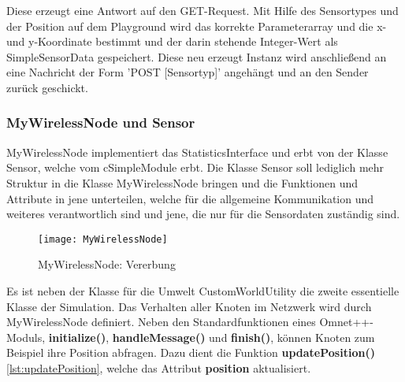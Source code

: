 Diese erzeugt eine Antwort auf den GET-Request. Mit Hilfe des Sensortypes und der Position auf dem Playground wird das korrekte Parameterarray und die x- und y-Koordinate bestimmt und der darin stehende Integer-Wert als SimpleSensorData gespeichert.
Diese neu erzeugt Instanz wird anschließend an eine Nachricht der Form 'POST [Sensortyp]' angehängt und an den Sender zurück geschickt.

\subsubsection{MyWirelessNode und Sensor}

MyWirelessNode implementiert das StatisticsInterface und erbt von der Klasse Sensor, welche vom cSimpleModule erbt. Die Klasse Sensor soll lediglich mehr Struktur in die Klasse MyWirelessNode bringen und die Funktionen und Attribute in jene unterteilen, welche für die allgemeine Kommunikation und weiteres verantwortlich sind und jene, die nur für die Sensordaten zuständig sind. \newline

\begin{figure}[htbp]
\centering
\caption{MyWirelessNode: Vererbung}
\texttt{[image: MyWirelessNode]}
\end{figure}

Es ist neben der Klasse für die Umwelt CustomWorldUtility die zweite essentielle Klasse der Simulation. Das Verhalten aller Knoten im Netzwerk wird durch MyWirelessNode definiert. Neben den Standardfunktionen eines Omnet++-Moduls, \textbf{initialize()}, \textbf{handleMessage()} und \textbf{finish()}, können Knoten zum Beispiel ihre Position abfragen. \newline
Dazu dient die Funktion \textbf{updatePosition()} \ref{lst:updatePosition}, welche das Attribut \textbf{position} aktualisiert.

